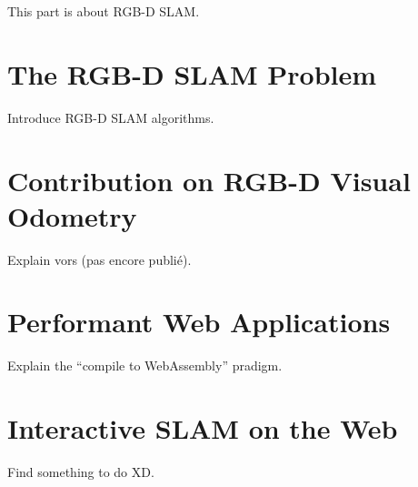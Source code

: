 This part is about RGB-D SLAM\@.

\chapter{The RGB-D SLAM Problem}%
\label{cha:the_rgb_d_slam_problem}

Introduce RGB-D SLAM algorithms.

\chapter{Contribution on RGB-D Visual Odometry}%
\label{cha:contribution_on_rgb_d_visual_odometry}

Explain vors (pas encore publié).

\chapter{Performant Web Applications}%
\label{cha:performant_web_applications}

Explain the ``compile to WebAssembly'' pradigm.

\chapter{Interactive SLAM on the Web}%
\label{cha:interactive_slam_on_the_web}

Find something to do XD\@.

